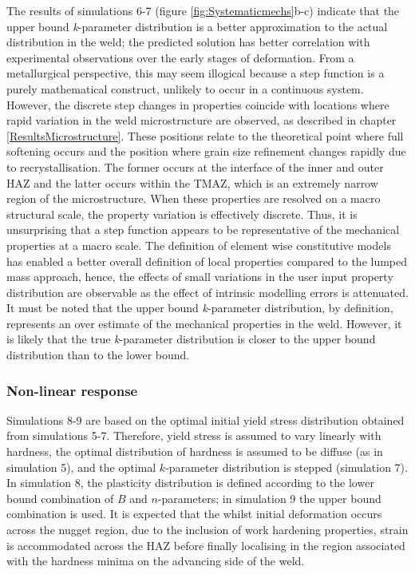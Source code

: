 The results of simulations 6-7 (figure \ref{fig:Systematicmechs}b-c) indicate that the upper bound \textit{k}-parameter distribution is a better approximation to the actual distribution in the weld; the predicted solution has better correlation with experimental observations over the early stages of deformation. From a metallurgical perspective, this may seem illogical because a step function is a purely mathematical construct, unlikely to occur in a continuous system. However, the discrete step changes in properties coincide with locations where rapid variation in the weld microstructure are observed, as described in chapter \ref{ResultsMicrostructure}. These positions relate to the theoretical point where full softening occurs and the position where grain size refinement changes rapidly due to recrystallisation. The former occurs at the interface of the inner and outer HAZ and the latter occurs within the TMAZ, which is an extremely narrow region of the microstructure. When these properties are resolved on a macro structural scale, the property variation is effectively discrete. Thus, it is unsurprising that a step function appears to be representative of the mechanical properties at a macro scale. The definition of element wise constitutive models has enabled a better overall definition of local properties compared to the lumped mass approach, hence, the effects of small variations in the user input property distribution are observable as the effect of intrinsic modelling errors is attenuated. It must be noted that the upper bound \textit{k}-parameter distribution, by definition, represents an over estimate of the mechanical properties in the weld. However, it is likely that the true \textit{k}-parameter distribution is closer to the upper bound distribution than to the lower bound. 

\subsubsection{Non-linear response}
\label{SMDModellingstudyDiscussionPropertydistributionsPS}
Simulations 8-9 are based on the optimal initial yield stress distribution obtained from simulations 5-7. Therefore, yield stress is assumed to vary linearly with hardness, the optimal distribution of hardness is assumed to be diffuse (as in simulation 5), and the optimal $k$-parameter distribution is stepped (simulation 7). In simulation 8, the plasticity distribution is defined according to the lower bound combination of $B$ and $n$-parameters; in simulation 9 the upper bound combination is used. It is expected that the whilst initial deformation occurs across the nugget region, due to the inclusion of work hardening properties, strain is accommodated across the HAZ before finally localising in the region associated with the hardness minima on the advancing side of the weld.

